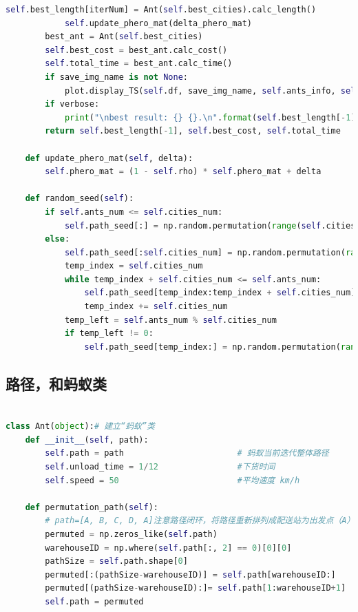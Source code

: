 \documentclass{cumcmthesis}
\begin{document}
\begin{appendices}
\begin{lstlisting}[language=Python]
            self.best_length[iterNum] = Ant(self.best_cities).calc_length()
            self.update_phero_mat(delta_phero_mat)                             # 更新信息素矩阵
        best_ant = Ant(self.best_cities)
        self.best_cost = best_ant.calc_cost()
        self.total_time = best_ant.calc_time()
        if save_img_name is not None:
            plot.display_TS(self.df, save_img_name, self.ants_info, self.best_length, self.best_cities)
        if verbose:
            print("\nbest result: {} {}.\n".format(self.best_length[-1], self.best_cost))
        return self.best_length[-1], self.best_cost, self.total_time

    def update_phero_mat(self, delta):
        self.phero_mat = (1 - self.rho) * self.phero_mat + delta

    def random_seed(self):                                                     # 产生随机的起始点下表，尽量保证所有蚂蚁的起始点不同
        if self.ants_num <= self.cities_num:                                   # 蚂蚁数 <= 城市数
            self.path_seed[:] = np.random.permutation(range(self.cities_num))[:self.ants_num]
        else:                                                                  # 蚂蚁数 > 城市数
            self.path_seed[:self.cities_num] = np.random.permutation(range(self.cities_num))
            temp_index = self.cities_num
            while temp_index + self.cities_num <= self.ants_num:
                self.path_seed[temp_index:temp_index + self.cities_num] = np.random.permutation(range(self.cities_num))
                temp_index += self.cities_num
            temp_left = self.ants_num % self.cities_num
            if temp_left != 0:
                self.path_seed[temp_index:] = np.random.permutation(range(self.cities_num))[:temp_left]

\end{lstlisting}
\subsection{路径，和蚂蚁类}
\begin{lstlisting}[language=Python]

class Ant(object):# 建立“蚂蚁”类
    def __init__(self, path):
        self.path = path                       # 蚂蚁当前迭代整体路径
        self.unload_time = 1/12                #下货时间
        self.speed = 50                        #平均速度 km/h

    def permutation_path(self):
        # path=[A, B, C, D, A]注意路径闭环，将路径重新排列成配送站为出发点（A）
        permuted = np.zeros_like(self.path)
        warehouseID = np.where(self.path[:, 2] == 0)[0][0]
        pathSize = self.path.shape[0]
        permuted[:(pathSize-warehouseID)] = self.path[warehouseID:]
        permuted[(pathSize-warehouseID):]= self.path[1:warehouseID+1]
        self.path = permuted


\end{lstlisting}
\end{appendices}
\end{document}

